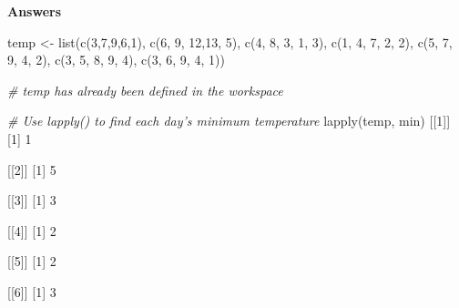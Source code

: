 \documentclass[]{article}
\newcommand{\hlnum}[1]{\textcolor[rgb]{0.816,0.125,0.439}{#1}}%
\newcommand{\hlstr}[1]{\textcolor[rgb]{0.251,0.627,0.251}{#1}}%
\newcommand{\hlcom}[1]{\textcolor[rgb]{0.502,0.502,0.502}{\textit{#1}}}%
\newcommand{\hlstd}[1]{\textcolor[rgb]{0.251,0.251,0.251}{#1}}%
\newcommand{\hlkwd}[1]{\textcolor[rgb]{0.878,0.439,0.125}{#1}}%
\newenvironment{Shaded}{\begin{myshaded}}{\end{myshaded}}
\newcommand{\KeywordTok}[1]{\hlkwd{#1}}
\newcommand{\DecValTok}[1]{\hlnum{#1}}
\newcommand{\StringTok}[1]{\hlstr{#1}}
\newcommand{\CommentTok}[1]{\hlcom{#1}}
\newcommand{\NormalTok}[1]{\hlstd{#1}}
\begin{document}
\textbf{Answers}

\begin{Shaded}
\begin{Highlighting}[]
\NormalTok{temp <-}\StringTok{ }\KeywordTok{list}\NormalTok{(}\KeywordTok{c}\NormalTok{(}\DecValTok{3}\NormalTok{,}\DecValTok{7}\NormalTok{,}\DecValTok{9}\NormalTok{,}\DecValTok{6}\NormalTok{,}\OperatorTok{-}\DecValTok{1}\NormalTok{), }\KeywordTok{c}\NormalTok{(}\DecValTok{6}\NormalTok{, }\DecValTok{9}\NormalTok{, }\DecValTok{12}\NormalTok{,}\DecValTok{13}\NormalTok{, }\DecValTok{5}\NormalTok{), }\KeywordTok{c}\NormalTok{(}\DecValTok{4}\NormalTok{, }\DecValTok{8}\NormalTok{, }\DecValTok{3}\NormalTok{, }\OperatorTok{-}\DecValTok{1}\NormalTok{, }\OperatorTok{-}\DecValTok{3}\NormalTok{), }\KeywordTok{c}\NormalTok{(}\DecValTok{1}\NormalTok{, }\DecValTok{4}\NormalTok{, }\DecValTok{7}\NormalTok{, }\DecValTok{2}\NormalTok{, }\OperatorTok{-}\DecValTok{2}\NormalTok{),}
             \KeywordTok{c}\NormalTok{(}\DecValTok{5}\NormalTok{, }\DecValTok{7}\NormalTok{, }\DecValTok{9}\NormalTok{, }\DecValTok{4}\NormalTok{, }\DecValTok{2}\NormalTok{), }\KeywordTok{c}\NormalTok{(}\OperatorTok{-}\DecValTok{3}\NormalTok{, }\DecValTok{5}\NormalTok{, }\DecValTok{8}\NormalTok{, }\DecValTok{9}\NormalTok{, }\DecValTok{4}\NormalTok{), }\KeywordTok{c}\NormalTok{(}\DecValTok{3}\NormalTok{, }\DecValTok{6}\NormalTok{, }\DecValTok{9}\NormalTok{, }\DecValTok{4}\NormalTok{, }\DecValTok{1}\NormalTok{))}

\CommentTok{# temp has already been defined in the workspace}

\CommentTok{# Use lapply() to find each day's minimum temperature}
\KeywordTok{lapply}\NormalTok{(temp, min)}
\NormalTok{   [[}\DecValTok{1}\NormalTok{]]}
\NormalTok{   [}\DecValTok{1}\NormalTok{] }\OperatorTok{-}\DecValTok{1}
   
\NormalTok{   [[}\DecValTok{2}\NormalTok{]]}
\NormalTok{   [}\DecValTok{1}\NormalTok{] }\DecValTok{5}
   
\NormalTok{   [[}\DecValTok{3}\NormalTok{]]}
\NormalTok{   [}\DecValTok{1}\NormalTok{] }\OperatorTok{-}\DecValTok{3}
   
\NormalTok{   [[}\DecValTok{4}\NormalTok{]]}
\NormalTok{   [}\DecValTok{1}\NormalTok{] }\OperatorTok{-}\DecValTok{2}
   
\NormalTok{   [[}\DecValTok{5}\NormalTok{]]}
\NormalTok{   [}\DecValTok{1}\NormalTok{] }\DecValTok{2}
   
\NormalTok{   [[}\DecValTok{6}\NormalTok{]]}
\NormalTok{   [}\DecValTok{1}\NormalTok{] }\OperatorTok{-}\DecValTok{3}
   

\end{Highlighting}
\end{Shaded}
\end{document}
